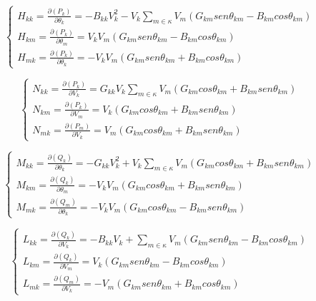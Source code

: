 \begin{equation}
  \left\{    \begin{array}{lll}
                H_{kk} = \frac{\partial (P_k)}{\partial \theta_k} = -B_{kk}V_k^2 - V_k\sum_{m\in \kappa} V_m(G_{km} sen\theta_{km} - B_{km}cos\theta_{km})\\
                H_{km} = \frac{\partial (P_k)}{\partial \theta_m} = V_k V_m (G_{km} sen\theta_{km} - B_{km}cos\theta_{km})\\
                H_{mk} = \frac{\partial (P_k)}{\partial \theta_k} =-V_k V_m (G_{km} sen\theta_{km} + B_{km}cos\theta_{km})
            \end{array}\right.
    \label{H_resolvido}
\end{equation}

\begin{equation}
  \left\{    \begin{array}{lll}
                N_{kk} = \frac{\partial (P_k)}{\partial V_k} = G_{kk}V_k \sum_{m\in \kappa} V_m(G_{km} cos\theta_{km} + B_{km}sen\theta_{km})\\
                N_{km} = \frac{\partial (P_k)}{\partial V_m} = V_k(G_{km} cos\theta_{km} + B_{km}sen\theta_{km})\\
                N_{mk} = \frac{\partial (P_m)}{\partial V_k} =V_m(G_{km} cos\theta_{km} + B_{km}sen\theta_{km})
            \end{array}\right.
    \label{N_resolvido}
\end{equation}

\begin{equation}
  \left\{    \begin{array}{lll}
                M_{kk} = \frac{\partial (Q_k)}{\partial \theta_k} = -G_{kk}V_k^2 + V_k\sum_{m\in \kappa} V_m(G_{km} cos\theta_{km} + B_{km}sen\theta_{km})\\
                M_{km} = \frac{\partial (Q_k)}{\partial \theta_m} = -V_k V_m (G_{km} cos\theta_{km} + B_{km}sen\theta_{km})\\
                M_{mk} = \frac{\partial (Q_m)}{\partial \theta_k} =-V_k V_m (G_{km} cos\theta_{km} - B_{km}sen\theta_{km})
            \end{array}\right.
    \label{M_resolvido}
\end{equation}

\begin{equation}
  \left\{    \begin{array}{lll}
                L_{kk} = \frac{\partial (Q_k)}{\partial V_k} = -B_{kk}V_k +\sum_{m\in \kappa} V_m(G_{km} sen\theta_{km} - B_{km}cos\theta_{km})\\
                L_{km} = \frac{\partial (Q_k)}{\partial V_m} = V_k(G_{km} sen\theta_{km} - B_{km}cos\theta_{km})\\
                L_{mk} = \frac{\partial (Q_m)}{\partial V_k} =-V_m (G_{km} sen\theta_{km} + B_{km}cos\theta_{km})
            \end{array}\right.
    \label{L_resolvido}
\end{equation}

